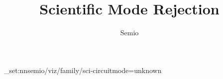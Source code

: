 \documentclass[type=paper,language=en,theme=light]{semio}
\title{Scientific Mode Rejection}
\author{Semio}
\date{}
\begin{document}
\SemioVizProbePage
\ExplSyntaxOn\keys_set:nn{semio/viz/family/sci-circuit}{mode=unknown}\ExplSyntaxOff
{}
\SemioVizProbeEnd
\end{document}
